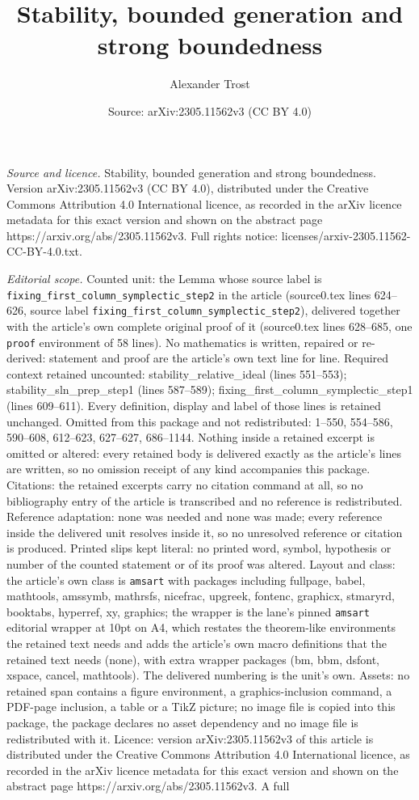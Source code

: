 \documentclass[10pt,a4paper]{amsart}
\title[Stability, bounded generation and strong boundedness]{Stability, bounded generation and strong boundedness}
\author{Alexander Trost}
\date{Source: arXiv:2305.11562v3 (CC BY 4.0)}
\begin{document}
\maketitle

\noindent\emph{Source and licence.} Stability, bounded generation and strong boundedness. Version arXiv:2305.11562v3 (CC BY 4.0), distributed under the Creative Commons Attribution 4.0 International licence, as recorded in the arXiv licence metadata for this exact version and shown on the abstract page https://arxiv.org/abs/2305.11562v3. Full rights notice: licenses/arxiv-2305.11562-CC-BY-4.0.txt.\par\smallskip

\noindent\textit{Editorial scope.} Counted unit: the Lemma whose source label is \texttt{fixing\_first\_column\_symplectic\_step2} in the article (source0.tex lines 624--626, source label \texttt{fixing\_first\_column\_symplectic\_step2}), delivered together with the article's own complete original proof of it (source0.tex lines 628--685, one \texttt{proof} environment of 58 lines). No mathematics is written, repaired or re-derived: statement and proof are the article's own text line for line. Required context retained uncounted: stability\_relative\_ideal (lines 551--553); stability\_sln\_prep\_step1 (lines 587--589); fixing\_first\_column\_symplectic\_step1 (lines 609--611). Every definition, display and label of those lines is retained unchanged. Omitted from this package and not redistributed: 1--550, 554--586, 590--608, 612--623, 627--627, 686--1144. Nothing inside a retained excerpt is omitted or altered: every retained body is delivered exactly as the article's lines are written, so no omission receipt of any kind accompanies this package. Citations: the retained excerpts carry no citation command at all, so no bibliography entry of the article is transcribed and no reference is redistributed. Reference adaptation: none was needed and none was made; every reference inside the delivered unit resolves inside it, so no unresolved reference or citation is produced. Printed slips kept literal: no printed word, symbol, hypothesis or number of the counted statement or of its proof was altered. Layout and class: the article's own class is \texttt{amsart} with packages including fullpage, babel, mathtools, amssymb, mathrsfs, nicefrac, upgreek, fontenc, graphicx, stmaryrd, booktabs, hyperref, xy, graphics; the wrapper is the lane's pinned \texttt{amsart} editorial wrapper at 10pt on A4, which restates the theorem-like environments the retained text needs and adds the article's own macro definitions that the retained text needs (none), with extra wrapper packages (bm, bbm, dsfont, xspace, cancel, mathtools). The delivered numbering is the unit's own. Assets: no retained span contains a figure environment, a graphics-inclusion command, a PDF-page inclusion, a table or a TikZ picture; no image file is copied into this package, the package declares no asset dependency and no image file is redistributed with it. Licence: version arXiv:2305.11562v3 of this article is distributed under the Creative Commons Attribution 4.0 International licence, as recorded in the arXiv licence metadata for this exact version and shown on the abstract page https://arxiv.org/abs/2305.11562v3. A full 
\end{document}
